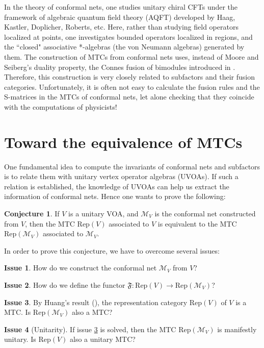 \documentclass[10pt]{amsart}
\theoremstyle{definition}
\newtheorem{conj}[df]{Conjecture}
\newtheorem{iss}{Issue}[section]
\theoremstyle{plain}
\newcommand{\Rep}{\mathrm{Rep}}
\begin{document}
In the theory of conformal nets, one studies  unitary chiral CFTs under the framework of algebraic quantum field theory (AQFT) developed by Haag, Kastler, Doplicher, Roberts, etc. Here, rather than studying field operators localized at points, one investigates bounded operators localized in regions, and the ``closed" associative *-algebras (the von Neumann algebras) generated by them. The construction of MTCs from conformal nets uses, instead of Moore and Seiberg's duality property, the Connes fusion of bimodules introduced in \cite{Connes fusion}. Therefore, this construction is very closely related to subfactors and their fusion categories. Unfortunately, it is often not easy to calculate the fusion rules and the S-matrices in the MTCs of conformal nets, let alone checking that they coincide  with the computations of physicists! 





\section {Toward the equivalence of MTCs}

One fundamental idea to compute the invariants of conformal nets and subfactors is to relate them with  unitary vertex operator algebras (UVOAs). If such a relation is established,   the knowledge of UVOAs can help us  extract the information of conformal nets. Hence one wants to prove the following:

\begin{conj}\label{conj1}
If $V$ is a unitary VOA, and $\mathcal M_V$ is the conformal net constructed from $V$, then the MTC $\Rep(V)$ associated to $V$ is equivalent to the MTC $\Rep(\mathcal M_V)$ associated to $\mathcal M_V$.
\end{conj}

In order to prove this conjecture, we have to overcome several issues:

\begin{iss}\label{iss1}
How do we construct the conformal net $\mathcal M_V$ from $V$?
\end{iss}

\begin{iss}\label{iss2}
How do we define the functor $\mathfrak F:\Rep(V)\rightarrow \Rep(\mathcal M_V)$?
\end{iss}


\begin{iss}\label{iss3}
By Huang's result (\cite{H modularity}), the representation category $\Rep(V)$ of $V$ is a MTC. Is $\Rep(\mathcal M_V)$ also a MTC?
\end{iss}
\begin{iss}[Unitarity]\label{iss4}
If issue \ref{iss3} is solved, then the MTC $\Rep(\mathcal M_V)$ is manifestly unitary. Is  $\Rep(V)$ also  a unitary MTC?
\end{iss}
\end{document}
